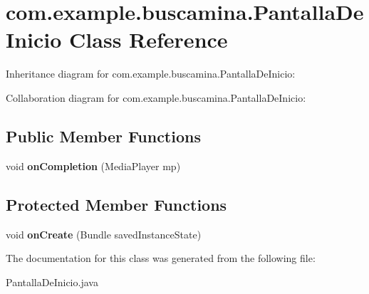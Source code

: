 \section{com.\-example.\-buscamina.\-Pantalla\-De\-Inicio Class Reference}
\label{classcom_1_1example_1_1buscamina_1_1_pantalla_de_inicio}


Inheritance diagram for com.\-example.\-buscamina.\-Pantalla\-De\-Inicio\-:


Collaboration diagram for com.\-example.\-buscamina.\-Pantalla\-De\-Inicio\-:
\subsection*{Public Member Functions}
\begin{DoxyCompactItemize}
\item 
void {\bfseries on\-Completion} (Media\-Player mp)\label{classcom_1_1example_1_1buscamina_1_1_pantalla_de_inicio_acc8f5d93f30b5c05d1a68217bd9bfe78}

\end{DoxyCompactItemize}
\subsection*{Protected Member Functions}
\begin{DoxyCompactItemize}
\item 
void {\bfseries on\-Create} (Bundle saved\-Instance\-State)\label{classcom_1_1example_1_1buscamina_1_1_pantalla_de_inicio_a52a5b484d27f2e242e3d96d04b73c446}

\end{DoxyCompactItemize}


The documentation for this class was generated from the following file\-:\begin{DoxyCompactItemize}
\item 
Pantalla\-De\-Inicio.\-java\end{DoxyCompactItemize}
